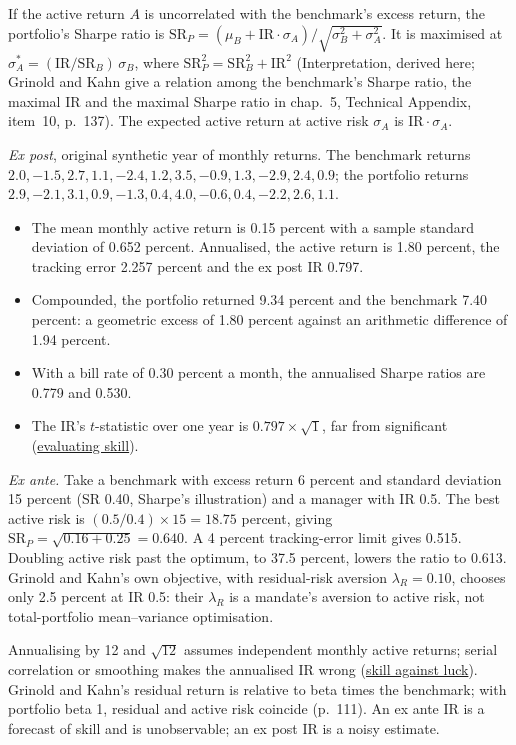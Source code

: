 \begin{qfmethod}
 If the active return $A$ is uncorrelated with the benchmark's excess return, the portfolio's Sharpe ratio is $\text{SR}_P=(\mu_B+\text{IR}\cdot\sigma_A)/\sqrt{\sigma_B^2+\sigma_A^2}$. It is maximised at $\sigma_A^*=(\text{IR}/\text{SR}_B)\,\sigma_B$, where $\text{SR}_P^2=\text{SR}_B^2+\text{IR}^2$ (Interpretation, derived here; Grinold and Kahn give a relation among the benchmark's Sharpe ratio, the maximal IR and the maximal Sharpe ratio in chap.~5, Technical Appendix, item~10, p.~137). The expected active return at active risk $\sigma_A$ is $\text{IR}\cdot\sigma_A$.

 \emph{Ex post}, original synthetic year of monthly returns. The benchmark returns $2.0,-1.5,2.7,1.1,-2.4,1.2,3.5,-0.9,1.3,-2.9,2.4,0.9$; the portfolio returns $2.9,-2.1,3.1,0.9,-1.3,0.4,4.0,-0.6,0.4,-2.2,2.6,1.1$.
\begin{itemize}
\item The mean monthly active return is 0.15 percent with a sample standard deviation of 0.652 percent. Annualised, the active return is 1.80 percent, the tracking error 2.257 percent and the ex post IR 0.797.
\item Compounded, the portfolio returned 9.34 percent and the benchmark 7.40 percent: a geometric excess of 1.80 percent against an arithmetic difference of 1.94 percent.
\item With a bill rate of 0.30 percent a month, the annualised Sharpe ratios are 0.779 and 0.530.
\item The IR's $t$-statistic over one year is $0.797\times\sqrt1$, far from significant (\hyperref[meth:manager-skill-evaluation]{evaluating skill}).
\end{itemize}

\emph{Ex ante.} Take a benchmark with excess return 6 percent and standard deviation 15 percent (SR 0.40, Sharpe's illustration) and a manager with IR 0.5. The best active risk is $(0.5/0.4)\times15=18.75$ percent, giving $\text{SR}_P=\sqrt{0.16+0.25}=0.640$. A 4 percent tracking-error limit gives 0.515. Doubling active risk past the optimum, to 37.5 percent, lowers the ratio to 0.613. Grinold and Kahn's own objective, with residual-risk aversion $\lambda_R=0.10$, chooses only 2.5 percent at IR 0.5: their $\lambda_R$ is a mandate's aversion to active risk, not total-portfolio mean--variance optimisation.

 Annualising by 12 and $\sqrt{12}$ assumes independent monthly active returns; serial correlation or smoothing makes the annualised IR wrong (\hyperref[meth:skill-luck-significance-tests]{skill against luck}). Grinold and Kahn's residual return is relative to beta times the benchmark; with portfolio beta 1, residual and active risk coincide (p.~111). An ex ante IR is a forecast of skill and is unobservable; an ex post IR is a noisy estimate.


\end{qfmethod}
